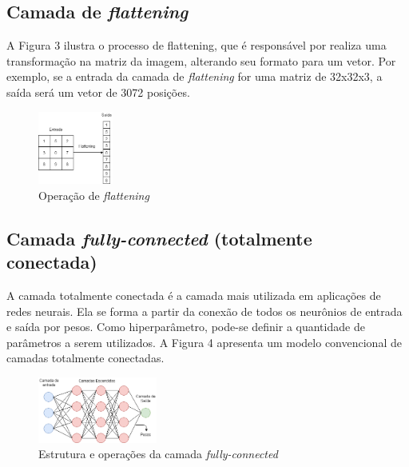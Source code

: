 \subsection{Camada de \textit{flattening}}

A Figura 3 ilustra o processo de flattening, que é responsável por realiza uma transformação na matriz da imagem, alterando seu formato para um vetor. Por exemplo, se a entrada da camada de \textit{flattening} for uma matriz de 32x32x3, a saída será um vetor de 3072 posições.

\begin{figure}[H]
	\includegraphics[width=0.22\textwidth, keepaspectratio=true]{figuras/flatten (1).png}
	\centering
	\caption[Operação de \textit{flattening}]{Operação de \textit{flattening}}
\end{figure}

\subsection{Camada \textit{fully-connected} (totalmente conectada)}
A camada totalmente conectada é a camada mais utilizada em aplicações de redes neurais. Ela se forma a partir da conexão de todos os neurônios de entrada e saída por pesos. Como hiperparâmetro, pode-se definir a quantidade de parâmetros a serem utilizados. A Figura 4 apresenta um modelo convencional de camadas totalmente conectadas.

\begin{figure}[H]
	\includegraphics[width=0.35\textwidth, keepaspectratio=true]{figuras/rede.png}
	\centering
	\caption[Estrutura e operações da camada \textit{fully-connected}]{Estrutura e operações da camada \textit{fully-connected}}
\end{figure}

